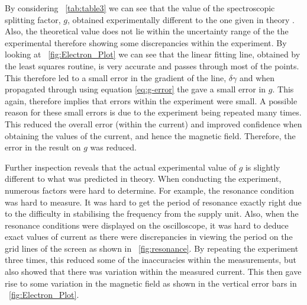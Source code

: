 \documentclass{article}
\newcommand{\figref}[2][\figurename~]{#1\ref{#2}}
\newcommand{\tabref}[2][\tablename~]{#1\ref{#2}}
\begin{document}
\vspace{2mm}
\noindent
By considering \tabref{tab:table3} we can see that the value of the spectroscopic splitting factor, $g$, obtained experimentally different to the one given in theory \cite{Paper02}. Also, the theoretical value does not lie within the uncertainty range of the the experimental therefore showing some discrepancies within the experiment. By looking at \figref{fig:Electron_Plot} we can see that the linear fitting line, obtained by the least squares routine, is very accurate and passes through most of the points. This therefore led to a small error in the gradient of the line, $\delta\gamma$ and when propagated through using equation \eqref{eq:g-error} the gave a small error in $g$. This again, therefore implies that errors within the experiment were small. A possible reason for these small errors is due to the experiment being repeated many times. This reduced the overall error (within the current) and improved confidence when obtaining the values of the current, and hence the magnetic field. Therefore, the error in the result on $g$ was reduced. 

\vspace{2mm}
\noindent
Further inspection reveals that the actual experimental value of $g$ is slightly different to what was predicted in theory. When conducting the experiment, numerous factors were hard to determine. For example, the resonance condition was hard to measure. It was hard to get the period of resonance exactly right due to the difficulty in stabilising the frequency from the supply unit. Also, when the resonance conditions were displayed on the oscilloscope, it was hard to deduce exact values of current as there were discrepancies in viewing the period on the grid lines of the screen as shown in \figref{fig:resonance}. By repeating the experiment three times, this reduced some of the inaccuracies within the measurements, but also showed that there was variation within the measured current. This then gave rise to some variation in the magnetic field as shown in the vertical error bars in \figref{fig:Electron_Plot}. 
\end{document}
